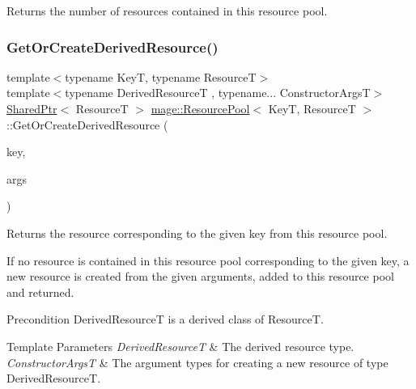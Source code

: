 Returns the number of resources contained in this resource pool. \hypertarget{classmage_1_1_resource_pool_a63bfe534b77e11798bfd301512c99f05}{}\label{classmage_1_1_resource_pool_a63bfe534b77e11798bfd301512c99f05} 
\subsubsection{\texorpdfstring{Get\+Or\+Create\+Derived\+Resource()}{GetOrCreateDerivedResource()}}
{\footnotesize\ttfamily template$<$typename KeyT, typename ResourceT$>$ \\
template$<$typename Derived\+ResourceT , typename... Constructor\+ArgsT$>$ \\
\hyperlink{namespacemage_a1e01ae66713838a7a67d30e44c67703e}{Shared\+Ptr}$<$ ResourceT $>$ \hyperlink{classmage_1_1_resource_pool}{mage\+::\+Resource\+Pool}$<$ KeyT, ResourceT $>$\+::Get\+Or\+Create\+Derived\+Resource (\begin{DoxyParamCaption}\item[{const KeyT \&}]{key,  }\item[{Constructor\+ArgsT \&\&...}]{args }\end{DoxyParamCaption})}

Returns the resource corresponding to the given key from this resource pool.

If no resource is contained in this resource pool corresponding to the given key, a new resource is created from the given arguments, added to this resource pool and returned.

\begin{DoxyPrecond}{Precondition}
{\ttfamily Derived\+ResourceT} is a derived class of {\ttfamily ResourceT}. 
\end{DoxyPrecond}

\begin{DoxyTemplParams}{Template Parameters}
{\em Derived\+ResourceT} & The derived resource type. \\
\hline
{\em Constructor\+ArgsT} & The argument types for creating a new resource of type {\ttfamily Derived\+ResourceT}. \\
\hline
\end{DoxyTemplParams}

